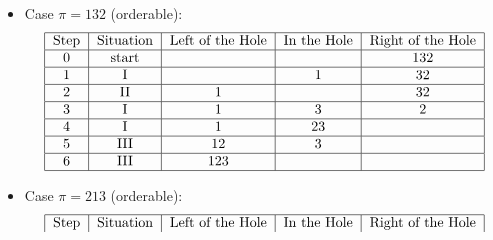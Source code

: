 \documentclass[10pt]{article}
\begin{document}
\begin{enumerate}
\begin{enumerate}
\begin{itemize}
\begin{itemize}
\begin{align*}
\begin{tabular}{|c|c|c|c|c|}
                             \hline
                             3& \text{I} & 1 & 2 & 3\\
                             \hline
                             4& \text{II} & 12 &  & 3\\
                             \hline
                             5& \text{I} & 12 & 3 & \\
                             \hline
                             6& \text{III} & 123 &  & \\
                             \hline
                        \end{tabular}
                    \end{align*}
                \item Case $\pi = 132$ (orderable):
                    \begin{align*}
                        \begin{tabular}{|c|c|c|c|c|}
                            \hline
                             \text{Step}& \text{Situation} & \text{Left of the Hole} & \text{In the Hole} & \text{Right of the Hole}\\
                             \hline
                             0& \text{start} &  &  & 132\\
                             \hline
                             1& \text{I} &  & 1 & 32\\
                             \hline
                             2& \text{II} &1 &  & 32\\
                             \hline
                             3& \text{I} & 1 & 3 & 2\\
                             \hline
                             4& \text{I} & 1 & 23 & \\
                             \hline
                             5& \text{III} & 12 & 3 & \\
                             \hline
                             6& \text{III} & 123 &  & \\
                             \hline
                        \end{tabular}
                    \end{align*}
                \item Case $\pi = 213$ (orderable):
                    \begin{align*}
                        \begin{tabular}{|c|c|c|c|c|}
                            \hline
                             \text{Step}& \text{Situation} & \text{Left of the Hole} & \text{In the Hole} & \text{Right of the Hole}\\

\end{tabular}
\end{align*}
\end{itemize}
\end{itemize}
\end{enumerate}
\end{enumerate}
\end{document}

